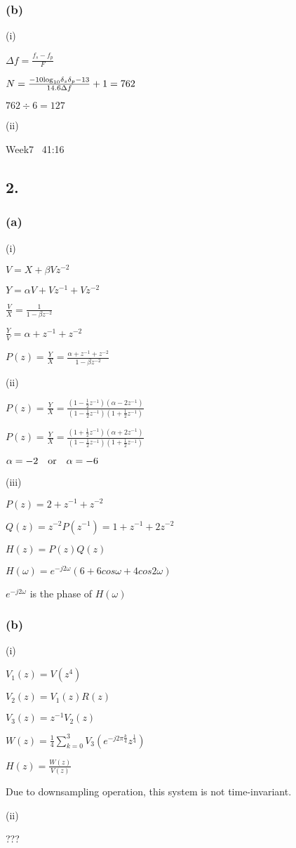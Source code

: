 \documentclass{article}
\begin{document}
\subsubsection*{(b)}
(i)\par
$\Delta f=\frac{f_{s}-f_{p}}{F}$\par
$N=\frac{-10{\rm log}_{10}\delta_{s}\delta_{p}-13}{14.6\Delta f}+1=762$\par
$762\div 6=127$\par
(ii)\par
Week7 \ 41:16


\subsection*{2.}
\subsubsection*{(a)}
(i)\par
$V=X+\beta V z^{-2}$\par
$Y=\alpha V+Vz^{-1}+Vz^{-2}$\par
$\frac{V}{X}=\frac{1}{1-\beta z^{-2}}$\par
$\frac{Y}{V}=\alpha +z^{-1}+z^{-2}$\par
$P(z)=\frac{Y}{X}=\frac{\alpha +z^{-1}+z^{-2}}{1-\beta z^{-2}}$\par
(ii)\par
$P(z)=\frac{Y}{X}=\frac{(1-\frac{1}{2} z^{-1})(\alpha-2z^{-1})}{(1-\frac{1}{2} z^{-1})(1+\frac{1}{2} z^{-1})}$\par
$P(z)=\frac{Y}{X}=\frac{(1+\frac{1}{2} z^{-1})(\alpha+2z^{-1})}{(1-\frac{1}{2} z^{-1})(1+\frac{1}{2} z^{-1})}$\par
$\alpha=-2 \quad {\rm or} \quad \alpha=-6$\par
(iii)\par
$P(z)=2+z^{-1}+z^{-2}$\par
$Q(z)=z^{-2}P(z^{-1})=1+z^{-1}+2z^{-2}$\par
$H(z)=P(z)Q(z)$\par
$H(\omega)=e^{-j2\omega}(6+6cos\omega+4cos2\omega)$\par
$e^{-j2\omega}$ is the phase of $H(\omega)$\par
\subsubsection*{(b)}
(i)\par
$V_{1}(z)=V(z^4)$\par
$V_{2}(z)=V_{1}(z)R(z)$\par
$V_{3}(z)=z^{-1}V_{2}(z)$\par
$W(z)=\frac{1}{4}\sum_{k=0}^{3}V_{3}(e^{-j2\pi \frac{k}{4}}z^{\frac{1}{4}})$\par
$H(z)=\frac{W(z)}{V(z)}$\par
Due to downsampling operation, this system is not time-invariant.\par
(ii)\par
???
\end{document}
